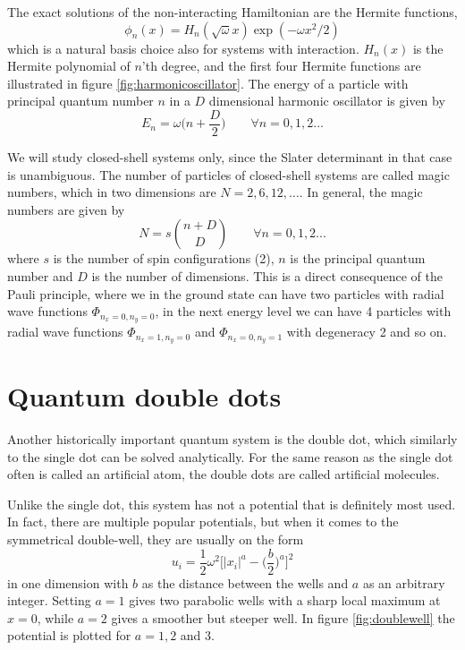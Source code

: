 The exact solutions of the non-interacting Hamiltonian are the Hermite functions, 
\begin{equation}
\phi_n(x)=H_n(\sqrt{\omega}x)\exp(-\omega x^2/2)
\end{equation}
which is a natural basis choice also for systems with interaction. $H_n(x)$ is the Hermite polynomial of $n$'th degree, and the first four Hermite functions are illustrated in figure \eqref{fig:harmonicoscillator}. The energy of a particle with principal quantum number $n$ in a $D$ dimensional harmonic oscillator is given by
\begin{equation}
E_n=\omega\Big(n+\frac{D}{2}\Big)\quad\quad\forall n=0,1,2...
\label{eq:HOenergies}
\end{equation}

We will study closed-shell systems only, since the Slater determinant in that case is unambiguous. \iffalse For open shells, the total Slater determinant is a linear combination of all the possible Slater determinants, and one can for instance use . \fi The number of particles of closed-shell systems are called magic numbers, which in two dimensions are $N=2,6,12,\hdots$. In general, the magic numbers are given by
\begin{equation}
N=s\binom{n+D}{D} \quad\quad\forall n=0,1,2...
\label{eq:HOclosedshell}
\end{equation}
where $s$ is the number of spin configurations (2), $n$ is the principal quantum number and $D$ is the number of dimensions. This is a direct consequence of the Pauli principle, where we in the ground state can have two particles with radial wave functions $\Phi_{n_x=0,n_y=0}$, in the next energy level we can have 4 particles with radial wave functions $\Phi_{n_x=1,n_y=0}$ and $\Phi_{n_x=0,n_y=1}$ with degeneracy 2 and so on. 


%

\section{Quantum double dots}
Another historically important quantum system is the double dot, which similarly to the single dot can be solved analytically. For the same reason as the single dot often is called an artificial atom, the double dots are called artificial molecules. 

Unlike the single dot, this system has not a potential that is definitely most used. In fact, there are multiple popular potentials, but when it comes to the symmetrical double-well, they are usually on the form 
\begin{equation}
u_i=\frac{1}{2}\omega^2\bigg[|x_i|^a-\Big(\frac{b}{2}\Big)^a\bigg]^2
\label{eq:doublewell}
\end{equation}
in one dimension with $b$ as the distance between the wells and $a$ as an arbitrary integer. \cite{jelic_double_2012} Setting $a=1$ gives two parabolic wells with a sharp local maximum at $x=0$, while $a=2$ gives a smoother but steeper well. In figure \eqref{fig:doublewell} the potential is plotted for $a=1,2$ and $3$.

